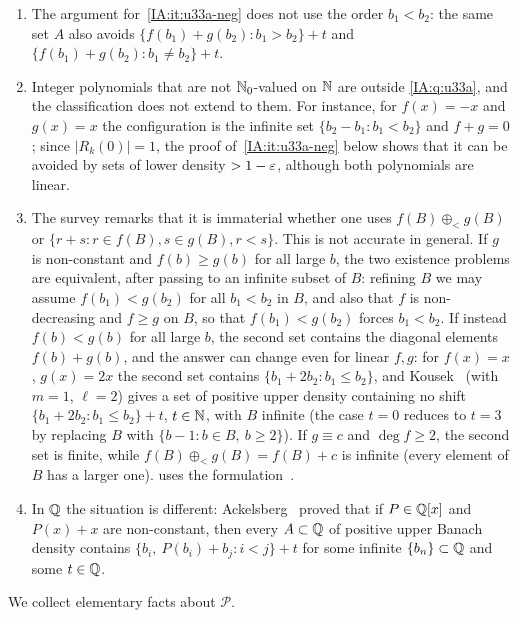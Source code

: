 \begin{remark}[Scope]\label{IA:rem:u33a-scope}
\begin{enumerate}[label=(\roman*)]
\item The argument for~\ref{IA:it:u33a-neg} does not use the order $b_1<b_2$: the same set $A$
also avoids $\{f(b_1)+g(b_2):b_1>b_2\}+t$ and $\{f(b_1)+g(b_2):b_1\neq b_2\}+t$.
\item Integer polynomials that are not $\mathbb{N}_0$-valued on $\mathbb{N}$ are outside \cref{IA:q:u33a}, and the
classification does not extend to them. For instance, for $f(x)=-x$ and $g(x)=x$ the configuration is
the infinite set $\{b_2-b_1:b_1<b_2\}$ and $f+g=0$; since $|R_k(0)|=1$, the proof
of~\ref{IA:it:u33a-neg} below shows that it can be avoided by sets of lower density $>1-\varepsilon$, although
both polynomials are linear.
\item The survey remarks that it is immaterial whether one uses $f(B)\oplus_<g(B)$ or
$\{r+s:r\in f(B),s\in g(B),r<s\}$. This is not accurate in general. If $g$ is non-constant and
$f(b)\ge g(b)$ for all large $b$, the two existence problems are equivalent, after passing to an
infinite subset of $B$: refining $B$ we may assume
$f(b_1)<g(b_2)$ for all $b_1<b_2$ in $B$, and also that $f$ is non-decreasing and $f\ge g$ on $B$, so
that $f(b_1)<g(b_2)$ forces $b_1<b_2$. If instead $f(b)<g(b)$ for all large $b$, the second set
contains the diagonal elements $f(b)+g(b)$, and the answer can change even for linear $f,g$: for
$f(x)=x$, $g(x)=2x$ the second set contains $\{b_1+2b_2:b_1\le b_2\}$, and
Kousek~\cite[Proposition~5.1]{kousek2025asymmetric} (with $m=1$, $\ell=2$) gives a set of positive
upper density containing no shift $\{b_1+2b_2:b_1\le b_2\}+t$, $t\in\mathbb{N}$, with $B$ infinite (the
case $t=0$ reduces to $t=3$ by replacing $B$ with $\{b-1:b\in B,\ b\ge2\}$). If $g\equiv c$ and $\deg f\ge2$, the
second set is finite, while $f(B)\oplus_<g(B)=f(B)+c$ is infinite (every element of $B$ has a
larger one).
 uses the formulation~\cite[(5)]{kra2023problems}.
\item In $\mathbb{Q}$ the situation is different: Ackelsberg~\cite[Theorem~1.4]{ackelsberg2025infinite}
proved that if $P\in\mathbb{Q}[x]$ and $P(x)+x$ are non-constant, then every $A\subset\mathbb{Q}$ of positive upper
Banach density contains $\{b_i,\ P(b_i)+b_j:i<j\}+t$ for some infinite $\{b_n\}\subset\mathbb{Q}$ and some
$t\in\mathbb{Q}$.
\end{enumerate}
\end{remark}

We collect elementary facts about $\mathcal P$.

